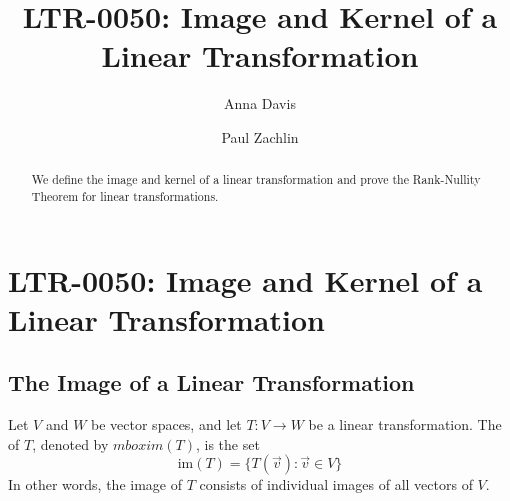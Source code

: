 \documentclass{ximera}
\author{Anna Davis \and Paul Zachlin} \title{LTR-0050: Image and Kernel of a Linear Transformation} \license{CC-BY 4.0}
\begin{document}
\begin{abstract}
  We define the image and kernel of a linear transformation and prove the Rank-Nullity Theorem for linear transformations.
\end{abstract}
\maketitle

\section*{LTR-0050: Image and Kernel of a Linear Transformation}
\subsection*{The Image of a Linear Transformation}
\begin{definition}\label{def:imageofT}
Let $V$ and $W$ be vector spaces, and let $T:V\rightarrow W$ be a linear transformation.  The  of $T$, denoted by $mbox{im}(T)$, is the set
$$\mbox{im}(T)=\{T(\vec{v}):\vec{v}\in V\}$$
In other words, the image of $T$ consists of individual images of all vectors of $V$.
\end{definition}
\end{document}
